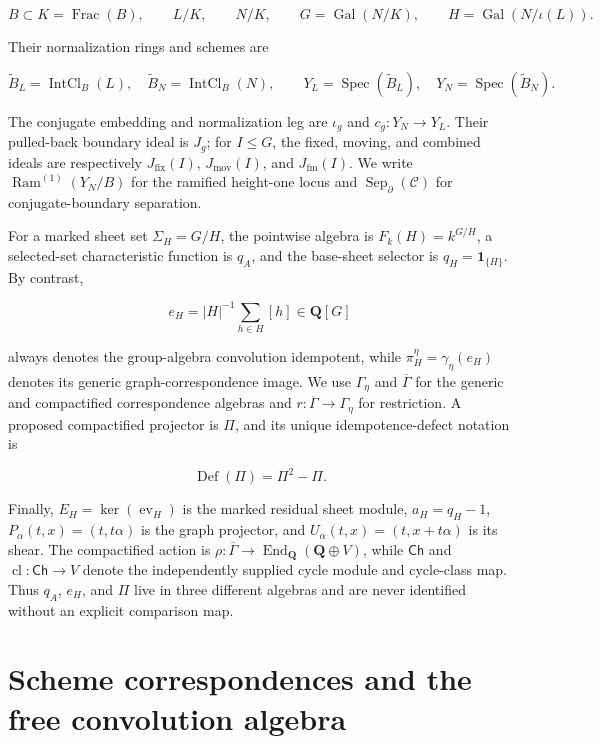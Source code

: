\documentclass[11pt]{article}
\theoremstyle{definition}
\theoremstyle{remark}
\DeclareMathOperator{\End}{End}
\DeclareMathOperator{\ev}{ev}
\DeclareMathOperator{\Gal}{Gal}
\DeclareMathOperator{\Def}{Def}
\newcommand{\Q}{\mathbf Q}
\newcommand{\one}{\mathbf 1}
\newcommand{\Geta}{\Gamma_{\eta}}
\newcommand{\Gbar}{\overline{\Gamma}}
\begin{document}
\[
  B\subset K=\operatorname{Frac}(B),\qquad
  L/K,\qquad N/K,\qquad
  G=\Gal(N/K),\qquad H=\Gal(N/\iota(L)).
\]

Their normalization rings and schemes are

\[
  \widetilde B_L=\operatorname{IntCl}_B(L),\quad
  \widetilde B_N=\operatorname{IntCl}_B(N),\qquad
  Y_L=\operatorname{Spec}(\widetilde B_L),\quad
  Y_N=\operatorname{Spec}(\widetilde B_N).
\]

The conjugate embedding and normalization leg are \(\iota_g\) and
\(c_g:Y_N\to Y_L\).  Their pulled-back boundary ideal is \(J_g\); for
\(I\leq G\), the fixed, moving, and combined ideals are respectively
\(J_{\mathrm{fix}}(I)\), \(J_{\mathrm{mov}}(I)\), and
\(J_{\mathrm{fm}}(I)\).  We write
\(\operatorname{Ram}^{(1)}(Y_N/B)\) for the ramified height-one locus and
\(\operatorname{Sep}_{\partial}(\mathcal C)\) for conjugate-boundary
separation.

For a marked sheet set \(\Sigma_H=G/H\), the pointwise algebra is
\(F_k(H)=k^{G/H}\), a selected-set characteristic function is \(q_A\), and
the base-sheet selector is \(q_H=\one_{\{H\}}\).  By contrast,

\[
  e_H=|H|^{-1}\sum_{h\in H}[h]\in\Q[G]
\]

always denotes the group-algebra convolution idempotent, while
\(\pi_H^\eta=\gamma_\eta(e_H)\) denotes its generic graph-correspondence
image.  We use \(\Geta\) and \(\Gbar\)
for the generic and compactified correspondence algebras and
\(r:\Gbar\to\Geta\) for restriction.  A proposed compactified projector is
\(\Pi\), and its unique idempotence-defect notation is

\[
  \Def(\Pi)=\Pi^2-\Pi.
\]

Finally, \(E_H=\ker(\ev_H)\) is the marked residual sheet module,
\(a_H=q_H-1\), \(P_\alpha(t,x)=(t,t\alpha)\) is the graph projector, and
\(U_\alpha(t,x)=(t,x+t\alpha)\) is its shear.  The compactified action is
\(\rho:\Gbar\to\End_{\Q}(\Q\oplus V)\), while \(\mathsf{Ch}\) and
\(\operatorname{cl}:\mathsf{Ch}\to V\) denote the independently supplied
cycle module and cycle-class map.  Thus \(q_A\), \(e_H\), and \(\Pi\) live
in three different algebras and are never identified without an explicit
comparison map.

\section{Scheme correspondences and the free convolution algebra}
\label{sec:correspondences}
\end{document}
